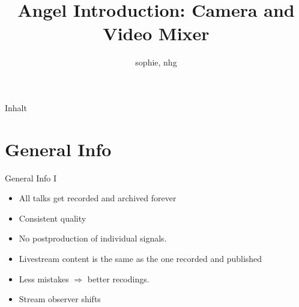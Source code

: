 \documentclass[aspectratio=169]{beamer}
\title{Angel Introduction: Camera and Video Mixer}
\author{sophie, nhg}
\institute{C3VOC}
\begin{document}

\maketitle

\begin{frame}{Inhalt}
\tableofcontents
\end{frame}


\newpage





\section{General Info}
\begin{frame}{General Info I}
	\begin{itemize}
		\item All talks get recorded and archived forever
		\item Consistent quality
		\item No postproduction of individual signals.
		\item Livestream content is the same as the one recorded and published
		\item Less mistakes $\Rightarrow$ better recodings.
		\item Stream observer shifts
	\end{itemize}
\end{frame}
\end{document}
